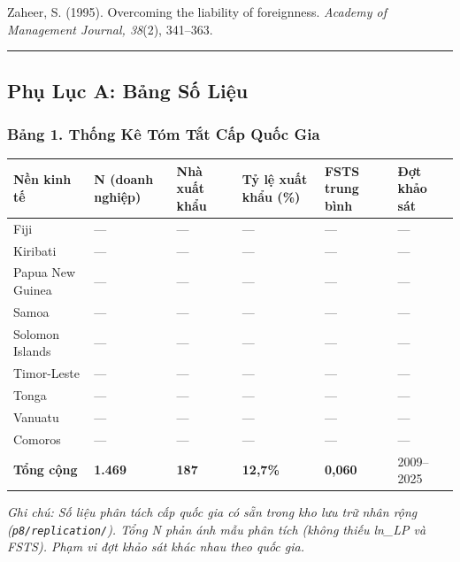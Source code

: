 \documentclass[12pt,a4paper]{article}
\begin{document}
Zaheer, S. (1995). Overcoming the liability of foreignness.
\emph{Academy of Management Journal, 38}(2), 341--363.

\begin{center}\rule{0.5\linewidth}{0.5pt}\end{center}

\hypertarget{phux1ee5-lux1ee5c-a-bux1ea3ng-sux1ed1-liux1ec7u}{%
\subsection{Phụ Lục A: Bảng Số
Liệu}\label{phux1ee5-lux1ee5c-a-bux1ea3ng-sux1ed1-liux1ec7u}}

\hypertarget{bux1ea3ng-1-thux1ed1ng-kuxea-tuxf3m-tux1eaft-cux1ea5p-quux1ed1c-gia}{%
\subsubsection{Bảng 1. Thống Kê Tóm Tắt Cấp Quốc
Gia}\label{bux1ea3ng-1-thux1ed1ng-kuxea-tuxf3m-tux1eaft-cux1ea5p-quux1ed1c-gia}}

\begin{longtable}[]{@{}llllll@{}}
\toprule\noalign{}
Nền kinh tế & N (doanh nghiệp) & Nhà xuất khẩu & Tỷ lệ xuất khẩu (\%) &
FSTS trung bình & Đợt khảo sát \\
\midrule\noalign{}
\endhead
\bottomrule\noalign{}
\endlastfoot
Fiji & --- & --- & --- & --- & --- \\
Kiribati & --- & --- & --- & --- & --- \\
Papua New Guinea & --- & --- & --- & --- & --- \\
Samoa & --- & --- & --- & --- & --- \\
Solomon Islands & --- & --- & --- & --- & --- \\
Timor-Leste & --- & --- & --- & --- & --- \\
Tonga & --- & --- & --- & --- & --- \\
Vanuatu & --- & --- & --- & --- & --- \\
Comoros & --- & --- & --- & --- & --- \\
\textbf{Tổng cộng} & \textbf{1.469} & \textbf{187} & \textbf{12,7\%} &
\textbf{0,060} & 2009--2025 \\
\end{longtable}

\emph{Ghi chú: Số liệu phân tách cấp quốc gia có sẵn trong kho lưu trữ
nhân rộng (\texttt{p8/replication/}). Tổng N phản ánh mẫu phân tích
(không thiếu ln\_LP và FSTS). Phạm vi đợt khảo sát khác nhau theo quốc
gia.}
\end{document}
